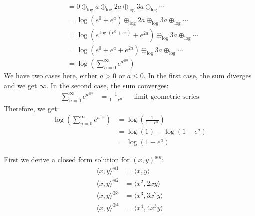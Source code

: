 \documentclass[a4paper,12pt]{ETHexercise}
\begin{document}
\begin{question}
\begin{subquestion}
\begin{align}
			                                              & = 0 \oplus_{\log} a \oplus_{\log} 2a \oplus_{\log} 3a \oplus_{\log}\cdots                   \\
			                                              & = \log\left( e^{0} + e^{a} \right) \oplus_{\log} 2a \oplus_{\log} 3a \oplus_{\log}\cdots    \\
			                                              & = \log \left( e^{\log(e^{0} + e^{a})} + e^{2a} \right) \oplus_{\log} 3a \oplus_{\log}\cdots \\
			                                              & = \log \left( e^{0} + e^{a} + e^{2a} \right) \oplus_{\log} 3a \oplus_{\log}\cdots           \\
			                                              & = \log \left( \sum_{n=0}^{\infty} e^{a^{\oplus n}} \right)
		\end{align}
		We have two cases here, either $a > 0$ or $a \leq 0$. In the first case, the sum diverges and we get $\infty$. In the second case, the sum converges:
		\begin{align}
			\sum_{n=0}^{\infty} e^{a^{\oplus n}} & = \frac{1}{1 - e^{a}} &  & \text{limit geometric series}
		\end{align}
		Therefore, we get:
		\begin{align}
			\log \left( \sum_{n=0}^{\infty} e^{a^{\oplus n}} \right) & = \log \left( \frac{1}{1 - e^{a}}\right) \\
			                                                         & = \log(1) - \log(1 - e^{a})              \\
			                                                         & = \log(1 - e^{a})
		\end{align}
	\end{subquestion}
	\begin{subquestion}
		First we derive a closed form solution for $(x, y)^{\oplus n}$:
		\begin{align}
			\langle x, y \rangle^{\oplus 1} & = \langle x, y \rangle                                              \\
			\langle x, y \rangle^{\oplus 2} & = \langle x^2, 2xy \rangle                                          \\
			\langle x, y \rangle^{\oplus 3} & = \langle x^3, 3x^2y \rangle                                        \\
			\langle x, y \rangle^{\oplus 4} & = \langle x^4, 4x^3y \rangle                                        \\

\end{align}
\end{subquestion}
\end{question}
\end{document}
